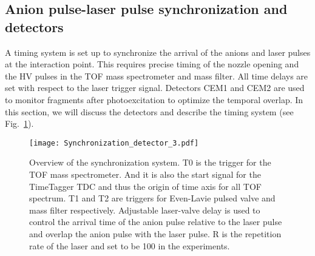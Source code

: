 \documentclass[%
aip,
rsi,
 amsmath,amssymb,
reprint,%
]{revtex4-1}
\begin{document}
\subsection{Anion pulse-laser pulse synchronization and detectors}

A timing system is set up to synchronize the arrival of the anions and laser pulses at the interaction point. This requires precise timing of the nozzle opening and the HV pulses in the TOF mass spectrometer and mass filter. All time delays are set with respect to the laser trigger signal. Detectors CEM1 and CEM2 are used to monitor fragments after photoexcitation to optimize the temporal overlap. In this section, we will discuss the detectors and describe the timing system (see Fig.~\ref{timing}). 

\begin{figure}
\centering
\texttt{[image: Synchronization\_detector\_3.pdf]} 
\caption{Overview of the synchronization system. T0 is the trigger for the TOF mass spectrometer. And it is also the start signal for the TimeTagger TDC and thus the origin of time axis for all TOF spectrum. T1 and T2 are triggers for Even-Lavie pulsed valve and mass filter respectively. Adjustable laser-valve delay is used to control the arrival time of the anion pulse relative to the laser pulse and overlap the anion pulse with the laser pulse. R is the repetition rate of the laser and set to be 100 in the experiments.}
\label{timing}
\end{figure}
\end{document}
